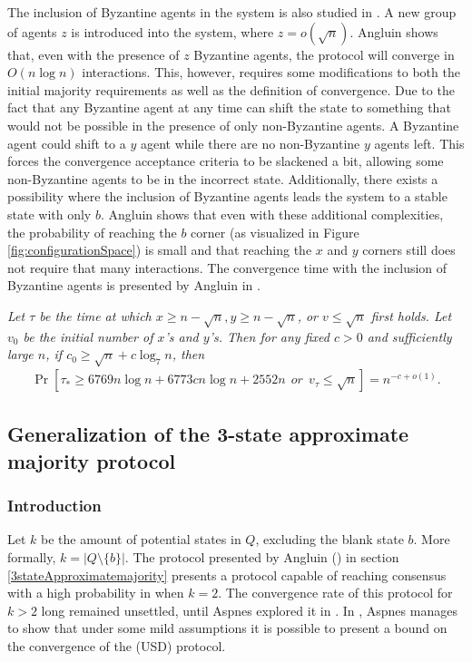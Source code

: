  The inclusion of Byzantine agents in the system is also studied in \cite{angluinSimplePopulationProtocol2008}. A new group of agents $z$ is introduced into the system, where $z = o(\sqrt{n})$. Angluin shows that, even with the presence of $z$ Byzantine agents, the protocol will converge in $O(n \log n)$ interactions. This, however, requires some modifications to both the initial majority requirements as well as the definition of convergence. Due to the fact that any Byzantine agent at any time can shift the state to something that would not be possible in the presence of only non-Byzantine agents. A Byzantine agent could shift to a $y$ agent while there are no non-Byzantine $y$ agents left. This forces the convergence acceptance criteria to be slackened a bit, allowing some non-Byzantine agents to be in the incorrect state. Additionally, there exists a possibility where the inclusion of Byzantine agents leads the system to a stable state with only $b$. Angluin shows that even with these additional complexities, the probability of reaching the $b$ corner (as visualized in Figure \ref{fig:configurationSpace}) is small and that reaching the $x$ and $y$ corners still does not require that many interactions. The convergence time with the inclusion of Byzantine agents is presented by Angluin in .
 
 \begin{theorem}
    \textit{Let $\tau$ be the time at which $x \geq n - \sqrt{n}, y \geq n - \sqrt{n}$, or $v \leq \sqrt{n}$ first holds. Let $v_0$ be the initial number of $x$'s and $y$'s. Then for any fixed $c > 0$ and sufficiently large $n$, if $c_0 \geq \sqrt{n} + c \log_7n$, then}
    \begin{align}
        \Pr [ \tau_* \geq 6769n \log n + 6773 c n \log n + 2552n \: \: or \: \: v_{\tau} \leq \sqrt{n}] = n^{-c+o(1)}.  \label{angluinTheorem4} 
    \end{align}
 \end{theorem} 
 
\subsection{Generalization of the 3-state approximate majority protocol}

 \subsubsection{Introduction}
Let $k$ be the amount of potential states in $Q$, excluding the blank state $b$. More formally, $k = |Q \setminus \{b\}|$. The protocol presented by Angluin (\cite{angluinSimplePopulationProtocol2008}) in section \ref{3stateApproximatemajority} presents a protocol capable of reaching consensus with a high probability in  when $k = 2$. The convergence rate of this protocol for $k > 2$ long remained unsettled, until Aspnes explored it in \cite{AspnesFastConverganceOfKOpinion2023}. In \cite{AspnesFastConverganceOfKOpinion2023}, Aspnes manages to show that under some mild assumptions it is possible to present a bound on the convergence of the (USD) protocol. 

